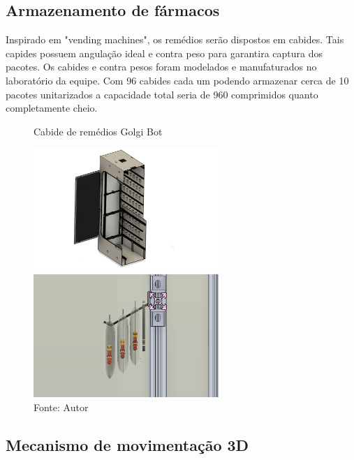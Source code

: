 \documentclass[../poliXuniversity_hospital_(USP)_report.tex]{subfiles}
\begin{document}
\subsection{Armazenamento de fármacos}
Inspirado em "vending machines", os remédios serão dispostos em cabides. Tais capides possuem angulação ideal e contra peso para garantira captura dos pacotes. Os cabides e contra pesos foram modelados e manufaturados no laboratório da equipe. Com 96 cabides cada um podendo armazenar cerca de 10 pacotes unitarizados a capacidade total seria de 960 comprimidos quanto completamente cheio.

\begin{figure}[h]
\centering
\caption{Cabide de remédios Golgi Bot}
    \begin{minipage}{0.5\textwidth}
       \centering
        
        \centering %
        \includegraphics[width=7cm]{images/angulada_cabide.png}
        
        
    \end{minipage}\hfill
    \begin{minipage}{0.5\textwidth}
        \centering
        \centering %
        \includegraphics[width=7cm]{images/lateral_cabide.png}
    \end{minipage}\hfill
    \caption*{Fonte: Autor}
    \label{figura: Estrutura Golgi Bot}
\end{figure}

\subsection{Mecanismo de movimentação 3D}
\end{document}
